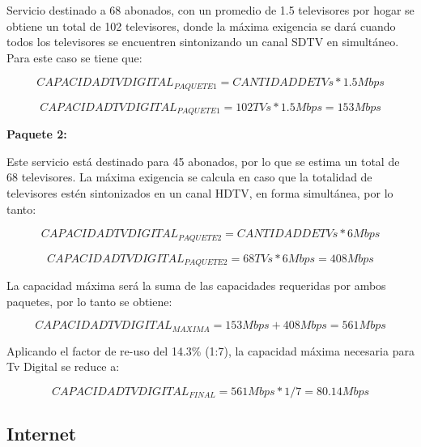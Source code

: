 \documentclass[12pt,a4paper]{book}
\begin{document}
Servicio destinado a 68 abonados, con un promedio de 1.5 televisores por hogar se obtiene un total de 102 televisores, donde la máxima exigencia se dará cuando todos los televisores se encuentren sintonizando un canal SDTV en simultáneo. Para este caso se tiene que:

\begin{center}

\begin{equation}
CAPACIDAD TV DIGITAL _{PAQUETE 1} = CANTIDAD DE TVs * 1.5 Mbps
\end{equation}

\begin{equation}
CAPACIDAD TV DIGITAL _{PAQUETE 1} = 102 TVs * 1.5 Mbps = 153 Mbps
\end{equation}

\end{center}

\noindent\textbf{Paquete 2:}

Este servicio está destinado para 45 abonados, por lo que se estima un total de 68 televisores. La máxima exigencia se calcula en caso que la totalidad de televisores estén sintonizados en un canal HDTV, en forma simultánea, por lo tanto:

\begin{equation}
CAPACIDAD TV DIGITAL _{PAQUETE 2} = CANTIDAD DE TVs * 6 Mbps
\end{equation}

\begin{equation}
CAPACIDAD TV DIGITAL _{PAQUETE 2} = 68 TVs * 6 Mbps = 408 Mbps
\end{equation}

La capacidad máxima será la suma de las capacidades requeridas por ambos paquetes, por lo tanto se obtiene:

\begin{equation}
CAPACIDAD TV DIGITAL _{MAXIMA} = 153 Mbps + 408 Mbps = 561 Mbps
\end{equation}

Aplicando el factor de re-uso del 14.3\% (1:7), la capacidad máxima necesaria para Tv Digital se reduce a:

\begin{equation}
CAPACIDAD TV DIGITAL _{FINAL} = 561 Mbps * 1/7 = 80.14 Mbps
\end{equation}



\subsection{Internet}
\end{document}
